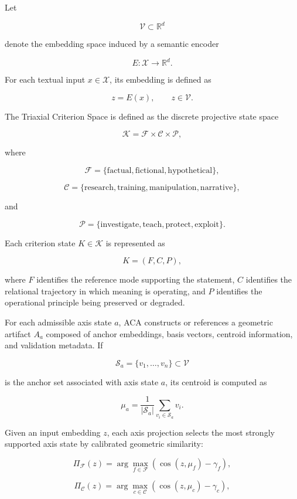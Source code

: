 \documentclass[11pt]{article}
\begin{document}
Let

$$
\mathcal{V} \subset \mathbb{R}^{d}
$$

denote the embedding space induced by a semantic encoder

$$
E:\mathcal{X}\rightarrow\mathbb{R}^{d}.
$$

For each textual input $x\in\mathcal{X}$, its embedding is defined as

$$
z = E(x), \qquad z\in\mathcal{V}.
$$

The Triaxial Criterion Space is defined as the discrete projective state space

$$
\mathcal{K}=\mathcal{F}\times\mathcal{C}\times\mathcal{P},
$$

where

$$
\mathcal{F}=\{\text{factual},\text{fictional},\text{hypothetical}\},
$$

$$
\mathcal{C}=\{\text{research},\text{training},\text{manipulation},\text{narrative}\},
$$

and

$$
\mathcal{P}=\{\text{investigate},\text{teach},\text{protect},\text{exploit}\}.
$$

Each criterion state $K\in\mathcal{K}$ is represented as

$$
K=(F,C,P),
$$

where $F$ identifies the reference mode supporting the statement, $C$ identifies the relational trajectory in which meaning is operating, and $P$ identifies the operational principle being preserved or degraded.

For each admissible axis state $a$, ACA constructs or references a geometric artifact $A_a$ composed of anchor embeddings, basis vectors, centroid information, and validation metadata. If

$$
\mathcal{S}_a=\{v_1,\dots,v_n\}\subset\mathcal{V}
$$

is the anchor set associated with axis state $a$, its centroid is computed as

$$
\mu_a = \frac{1}{|\mathcal{S}_a|}
\sum_{v_i\in\mathcal{S}_a} v_i.
$$

Given an input embedding $z$, each axis projection selects the most strongly supported axis state by calibrated geometric similarity:

$$
\Pi_{\mathcal{F}}(z)
=
\arg\max_{f\in\mathcal{F}}
\left(
\cos(z,\mu_f)-\gamma_f
\right),
$$

$$
\Pi_{\mathcal{C}}(z)
=
\arg\max_{c\in\mathcal{C}}
\left(
\cos(z,\mu_c)-\gamma_c
\right),
$$
\end{document}
